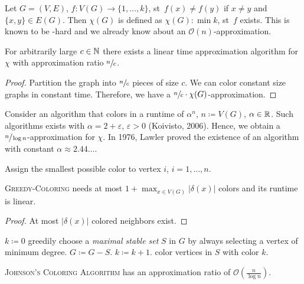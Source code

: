 \documentclass[../skript.tex]{subfiles}
\begin{document}
Let $G = (V, E)$, $f : V(G) \to \{ 1, \ldots, k\}$, \ac{st}~$f(x) \neq f(y)$ if $x \neq y$ and $\{ x, y \} \in E(G)$. Then $\chi(G)$ is defined as $\chi(G) : \min k$, \ac{st}~$f$ exists. This is known to be \NP-hard and we already know about an $\mathcal{O}(n)$-approximation.
\begin{proposition} %
\label{prop:32}
For arbitrarily large $c \in \mathbb{N}$ there exists a linear time approximation algorithm for $\chi$ with approximation ratio $\sfrac{n}{c}$.
\end{proposition}
\begin{proof}
Partition the graph into $\sfrac{n}{c}$ pieces of size $c$. We can color constant size graphs in constant time. Therefore, we have a $\sfrac{n}{c} \cdot \chi(G)$-approximation.
\end{proof}
Consider an algorithm that colors in a runtime of $\alpha^n$, $n \coloneqq V(G)$, $\alpha \in \mathbb{R}$. Such algorithms exists with $\alpha = 2 + \varepsilon$, $\varepsilon > 0$ (Koivisto, 2006). Hence, we obtain a $\sfrac{n}{\log n}$-approximation for $\chi$. In 1976, Lawler proved the existence of an algorithm with constant $\alpha \approx 2.44\ldots$.
\begin{algorithm}
\begin{algorithmic}[1]
\State Assign the smallest possible color to vertex $i$, $i = 1, \ldots, n$.
\end{algorithmic}
\end{algorithm}
\begin{theorem} %
\textsc{Greedy-Coloring} needs at most $1 + \max_{x \in V(G)} |\delta(x)|$ colors and its runtime is linear.
\end{theorem}
\begin{proof}
At most $|\delta(x)|$ colored neighbors exist.
\end{proof}
\begin{algorithm}
\begin{algorithmic}[1]
\State $k \coloneqq 0$
	\State greedily choose a \emph{maximal stable set} $S$ in $G$ by always selecting a vertex of minimum degree.
	\State $G \coloneqq G - S$.
	\State $k \coloneqq k + 1$.
	\State color vertices in $S$ with color $k$.
\EndWhile
\end{algorithmic}
\end{algorithm}
\begin{theorem} %
\textsc{Johnson's Coloring Algorithm} has an approximation ratio of $\mathcal{O}(\frac{n}{\log n})$.
\end{theorem}
\end{document}
